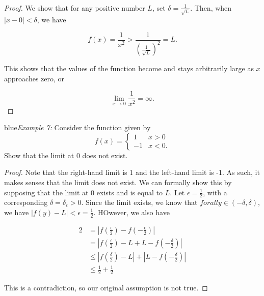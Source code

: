          \\

        \begin{proof}
            We show that for any positive number $L$, set $\delta=\frac{1}{\sqrt{L}}$. Then, when $|x-0|<\delta$, we have

            \[
                f(x) = \frac{1}{x^2} > \frac{1}{\left(\frac{1}{\sqrt{L}}\right)^2} = L.
            \]

            This shows that the values of the function become and stays arbitrarily large as $x$ approaches zero, or

            \[
                \lim_{x\to 0} \frac{1}{x^2} = \infty.
            \]
        \end{proof}

        blue{\textit{Example 7:} Consider the function given by
        \[
            f(x) =
            \begin{cases}
                1   & x > 0 \\
                -1  & x < 0.
            \end{cases}
        \]
        Show that the limit at 0 does not exist.} \\

        \begin{proof}
            Note that the right-hand limit is 1 and the left-hand limit is -1. As such, it makes senses that the limit does not exist. We can formally show this by supposing that the limit at 0 exists and is equal to $L$.
            Let $\epsilon=\frac{1}{2}$, with a corresponding $\delta=\delta_{\epsilon}>0$. Since the limit exists, we know that $forall y\in (-\delta, \delta)$, we have $|f(y)-L|<\epsilon=\frac{1}{2}$. HOwever, we also have

            \begin{align*}
                2   &= \left|f\left(\frac{\epsilon}{2}\right)-f\left(-\frac{\epsilon}{2}\right)\right| \\
                    &= \left|f\left(\frac{\epsilon}{2}\right)-L+L-f\left(-\frac{\delta}{2}\right)\right| \\
                    &\leq \left|f\left(\frac{\delta}{2}\right)-L\right| + \left|L-f\left(-\frac{\delta}{2}\right)\right| \\
                    &\leq \frac{1}{2} + \frac{1}{2}
            \end{align*}

            This is a contradiction, so our original assumption is not true.
        \end{proof}

